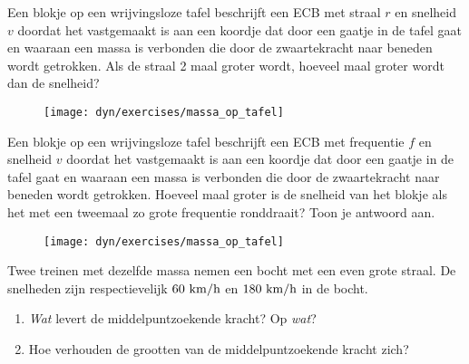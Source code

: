 \documentclass{ximera}
\begin{document}
\begin{exercise} Een blokje op een wrijvingsloze tafel beschrijft een ECB met straal $r$ en snelheid $v$ doordat het vastgemaakt is aan een koordje dat door een gaatje in de tafel gaat en waaraan een massa is verbonden die door de zwaartekracht naar beneden wordt getrokken. Als de straal 2 maal groter wordt, hoeveel maal groter wordt dan de snelheid?
\begin{figure}[h]
\begin{center}
\texttt{[image: dyn/exercises/massa\_op\_tafel]}
\end{center}
\end{figure}

\end{exercise}

\begin{exercise} Een blokje op een wrijvingsloze tafel beschrijft een ECB met frequentie $f$ en snelheid $v$ doordat het
vastgemaakt is aan een koordje dat door een gaatje in de tafel gaat en waaraan een massa is verbonden die door de zwaartekracht naar beneden wordt getrokken. Hoeveel maal groter is de snelheid van het blokje als het met een tweemaal zo grote frequentie ronddraait? Toon je antwoord aan.
\begin{figure}[!h]
\begin{center}
\texttt{[image: dyn/exercises/massa\_op\_tafel]}
\end{center}
\end{figure}



\end{exercise}

\begin{exercise} Twee treinen met dezelfde massa nemen een bocht met een even grote straal. De snelheden zijn respectievelijk $60~\rm km/h$ en
$180~\rm km/h$ in de bocht.
\begin{enumerate}
\item \textit{Wat} levert de middelpuntzoekende kracht? Op
\textit{wat}?
\item Hoe verhouden de grootten van de middelpuntzoekende kracht zich?
\end{enumerate}


\end{exercise}
\end{document}
